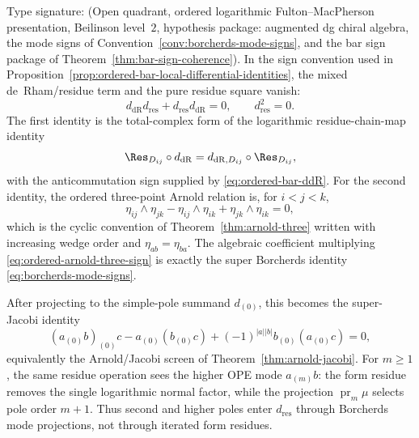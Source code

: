 \begin{corollary}
\label{cor:ordered-arnold-borcherds-residue-cancellation}
Type signature: \textup{(}Open quadrant, ordered logarithmic
Fulton--MacPherson presentation, Beilinson level~$2$, hypothesis
package: augmented dg chiral algebra, the mode signs of
Convention~\ref{conv:borcherds-mode-signs}, and the bar sign package
of Theorem~\ref{thm:bar-sign-coherence}\textup{)}.
In the sign convention used in
Proposition~\ref{prop:ordered-bar-local-differential-identities}, the
mixed de~Rham/residue term and the pure residue square vanish:
\[
d_{\mathrm{dR}}d_{\mathrm{res}}
+d_{\mathrm{res}}d_{\mathrm{dR}}=0,\qquad
d_{\mathrm{res}}^2=0.
\]
The first identity is the total-complex form of the logarithmic
residue-chain-map identity
\[
\Res_{D_{ij}}\circ d_{\mathrm{dR}}
=d_{\mathrm{dR},D_{ij}}\circ\Res_{D_{ij}},
\]
with the anticommutation sign supplied by
\eqref{eq:ordered-bar-ddR}.  For the second identity, the ordered
three-point Arnold relation is, for \(i<j<k\),
\begin{equation}\label{eq:ordered-arnold-three-sign}
\eta_{ij}\wedge\eta_{jk}
-\eta_{ij}\wedge\eta_{ik}
+\eta_{jk}\wedge\eta_{ik}=0,
\end{equation}
which is the cyclic convention of Theorem~\ref{thm:arnold-three}
written with increasing wedge order and
\(\eta_{ab}=\eta_{ba}\). The algebraic coefficient multiplying
\eqref{eq:ordered-arnold-three-sign} is exactly the super Borcherds
identity \eqref{eq:borcherds-mode-signs}.

After projecting to the simple-pole summand \(d_{(0)}\), this becomes
the super-Jacobi identity
\[
(a_{(0)}b)_{(0)}c-a_{(0)}(b_{(0)}c)
+(-1)^{|a||b|}b_{(0)}(a_{(0)}c)=0,
\]
equivalently the Arnold/Jacobi screen of
Theorem~\ref{thm:arnold-jacobi}. For \(m\ge1\), the same residue
operation sees the higher OPE mode \(a_{(m)}b\): the form residue
removes the single logarithmic normal factor, while the projection
\(\operatorname{pr}_m\mu\) selects pole order \(m+1\). Thus second and
higher poles enter \(d_{\mathrm{res}}\) through Borcherds mode
projections, not through iterated form residues.
\end{corollary}


